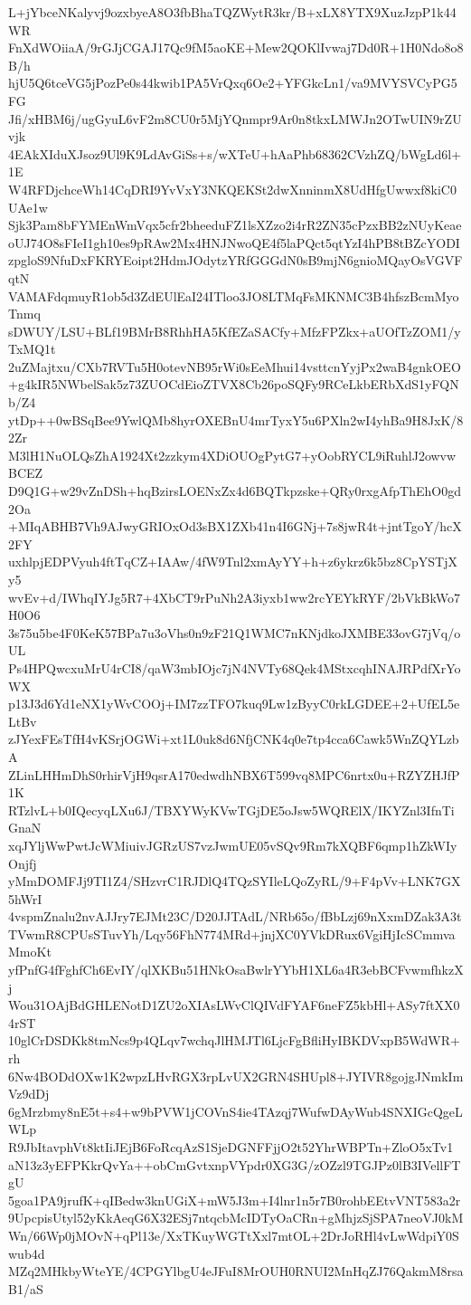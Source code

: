L+jYbceNKalyvj9ozxbyeA8O3fbBhaTQZWytR3kr/B+xLX8YTX9XuzJzpP1k44WR
FnXdWOiiaA/9rGJjCGAJ17Qc9fM5aoKE+Mew2QOKlIvwaj7Dd0R+1H0Ndo8o8B/h
hjU5Q6tceVG5jPozPe0s44kwib1PA5VrQxq6Oe2+YFGkcLn1/va9MVYSVCyPG5FG
Jfi/xHBM6j/ugGyuL6vF2m8CU0r5MjYQnmpr9Ar0n8tkxLMWJn2OTwUIN9rZUvjk
4EAkXIduXJsoz9Ul9K9LdAvGiSs+s/wXTeU+hAaPhb68362CVzhZQ/bWgLd6l+1E
W4RFDjchceWh14CqDRI9YvVxY3NKQEKSt2dwXnninmX8UdHfgUwwxf8kiC0UAe1w
Sjk3Pam8bFYMEnWmVqx5cfr2bheeduFZ1lsXZzo2i4rR2ZN35cPzxBB2zNUyKeae
oUJ74O8sFIeI1gh10es9pRAw2Mx4HNJNwoQE4f5laPQct5qtYzI4hPB8tBZcYODI
zpgloS9NfuDxFKRYEoipt2HdmJOdytzYRfGGGdN0sB9mjN6gnioMQayOsVGVFqtN
VAMAFdqmuyR1ob5d3ZdEUlEaI24ITloo3JO8LTMqFsMKNMC3B4hfszBcmMyoTnmq
sDWUY/LSU+BLf19BMrB8RhhHA5KfEZaSACfy+MfzFPZkx+aUOfTzZOM1/yTxMQ1t
2uZMajtxu/CXb7RVTu5H0otevNB95rWi0sEeMhui14vsttcnYyjPx2waB4gnkOEO
+g4kIR5NWbelSak5z73ZUOCdEioZTVX8Cb26poSQFy9RCeLkbERbXdS1yFQNb/Z4
ytDp++0wBSqBee9YwlQMb8hyrOXEBnU4mrTyxY5u6PXln2wI4yhBa9H8JxK/82Zr
M3lH1NuOLQsZhA1924Xt2zzkym4XDiOUOgPytG7+yOobRYCL9iRuhlJ2owvwBCEZ
D9Q1G+w29vZnDSh+hqBzirsLOENxZx4d6BQTkpzske+QRy0rxgAfpThEhO0gd2Oa
+MIqABHB7Vh9AJwyGRIOxOd3sBX1ZXb41n4I6GNj+7s8jwR4t+jntTgoY/hcX2FY
uxhlpjEDPVyuh4ftTqCZ+IAAw/4fW9Tnl2xmAyYY+h+z6ykrz6k5bz8CpYSTjXy5
wvEv+d/IWhqIYJg5R7+4XbCT9rPuNh2A3iyxb1ww2rcYEYkRYF/2bVkBkWo7H0O6
3s75u5be4F0KeK57BPa7u3oVhs0n9zF21Q1WMC7nKNjdkoJXMBE33ovG7jVq/oUL
Ps4HPQwcxuMrU4rCI8/qaW3mbIOjc7jN4NVTy68Qek4MStxcqhINAJRPdfXrYoWX
p13J3d6Yd1eNX1yWvCOOj+IM7zzTFO7kuq9Lw1zByyC0rkLGDEE+2+UfEL5eLtBv
zJYexFEsTfH4vKSrjOGWi+xt1L0uk8d6NfjCNK4q0e7tp4cca6Cawk5WnZQYLzbA
ZLinLHHmDhS0rhirVjH9qsrA170edwdhNBX6T599vq8MPC6nrtx0u+RZYZHJfP1K
RTzlvL+b0IQecyqLXu6J/TBXYWyKVwTGjDE5oJsw5WQRElX/IKYZnl3IfnTiGnaN
xqJYljWwPwtJcWMiuivJGRzUS7vzJwmUE05vSQv9Rm7kXQBF6qmp1hZkWIyOnjfj
yMmDOMFJj9TI1Z4/SHzvrC1RJDlQ4TQzSYIleLQoZyRL/9+F4pVv+LNK7GX5hWrI
4vspmZnalu2nvAJJry7EJMt23C/D20JJTAdL/NRb65o/fBbLzj69nXxmDZak3A3t
TVwmR8CPUsSTuvYh/Lqy56FhN774MRd+jnjXC0YVkDRux6VgiHjIcSCmmvaMmoKt
yfPnfG4fFghfCh6EvIY/qlXKBu51HNkOsaBwlrYYbH1XL6a4R3ebBCFvwmfhkzXj
Wou31OAjBdGHLENotD1ZU2oXIAsLWvClQIVdFYAF6neFZ5kbHl+ASy7ftXX04rST
10glCrDSDKk8tmNcs9p4QLqv7wchqJlHMJTl6LjcFgBfliHyIBKDVxpB5WdWR+rh
6Nw4BODdOXw1K2wpzLHvRGX3rpLvUX2GRN4SHUpl8+JYIVR8gojgJNmkImVz9dDj
6gMrzbmy8nE5t+s4+w9bPVW1jCOVnS4ie4TAzqj7WufwDAyWub4SNXIGcQgeLWLp
R9JbItavphVt8ktIiJEjB6FoRcqAzS1SjeDGNFFjjO2t52YhrWBPTn+ZloO5xTv1
aN13z3yEFPKkrQvYa++obCmGvtxnpVYpdr0XG3G/zOZzl9TGJPz0lB3IVellFTgU
5goa1PA9jrufK+qIBedw3knUGiX+mW5J3m+I4lnr1n5r7B0rohbEEtvVNT583a2r
9UpcpisUtyl52yKkAeqG6X32ESj7ntqcbMcIDTyOaCRn+gMhjzSjSPA7neoVJ0kM
Wn/66Wp0jMOvN+qPl13e/XxTKuyWGTtXxl7mtOL+2DrJoRHl4vLwWdpiY0Swub4d
MZq2MHkbyWteYE/4CPGYlbgU4eJFuI8MrOUH0RNUI2MnHqZJ76QakmM8rsaB1/aS
